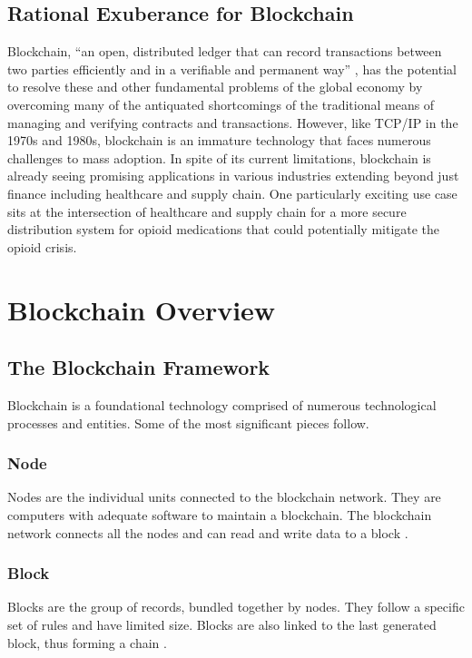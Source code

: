 \documentclass[sigconf]{acmart}
\begin{document}
\subsection{Rational Exuberance for Blockchain}
Blockchain, ``an open, distributed ledger that can record transactions between two parties efficiently and in a verifiable and permanent way'' \cite{hbr}, has the potential to resolve these and other fundamental problems of the global economy by overcoming many of the antiquated shortcomings of the traditional means of managing and verifying contracts and transactions. However, like TCP/IP in the 1970s and 1980s, blockchain is an immature technology that faces numerous challenges to mass adoption. In spite of its current limitations, blockchain is already seeing promising applications in various industries extending beyond just finance including healthcare and supply chain. One particularly exciting use case sits at the intersection of healthcare and supply chain for a more secure distribution system for opioid medications that could potentially mitigate the opioid crisis.

\section{Blockchain Overview}
\subsection{The Blockchain Framework}
Blockchain is a foundational technology comprised of numerous technological processes and entities. Some of the most significant pieces follow.

\subsubsection{Node} Nodes are the individual units connected to the blockchain network. They are computers with adequate software to maintain a blockchain. The blockchain network connects all the nodes and can read and write data to a block \cite{pabc1} \cite{pabc2}.

\subsubsection{Block} Blocks are the group of records, bundled together by nodes. They follow a specific set of rules and have limited size. Blocks are also linked to the last generated block, thus forming a chain \cite{pabc1}.
\end{document}
